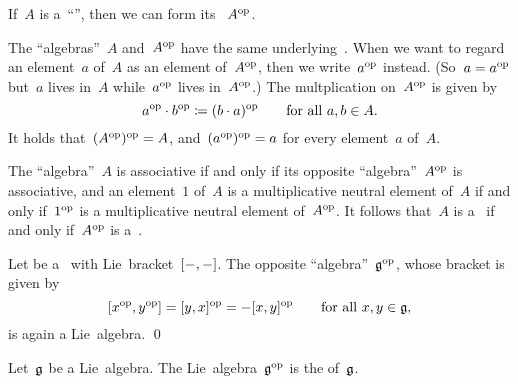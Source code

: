 \begin{recall}
	If~$A$ is a~\enquote{\algebra{$\kf$}}, then we can form its ~$A^{\mathrm{op}}$.

	The \enquote{algebras}~$A$ and~$A^{\mathrm{op}}$ have the same underlying~\vectorspace{$\kf$}.
	When we want to regard an element~$a$ of~$A$ as an element of~$A^{\mathrm{op}}$, then we write~$a^{\mathrm{op}}$ instead.
	(So~$a = a^{\mathrm{op}}$ but~$a$ lives in~$A$ while~$a^{\mathrm{op}}$ lives in~$A^{\mathrm{op}}$.)
	The multplication on~$A^{\mathrm{op}}$ is given by
	\[
		a^{\mathrm{op}} \cdot b^{\mathrm{op}}
		\coloneqq
		(b \cdot a)^{\mathrm{op}}
		\qquad
		\text{for all~$a, b \in A$.}
	\]
	It holds that~$(A^{\mathrm{op}})^{\mathrm{op}} = A$, and~$(a^{\mathrm{op}})^{\mathrm{op}} = a$ for every element~$a$ of~$A$.

	The \enquote{algebra}~$A$ is associative if and only if its opposite \enquote{algebra}~$A^{\mathrm{op}}$ is associative, and an element~$1$ of~$A$ is a multiplicative neutral element of~$A$ if and only if~$1^{\mathrm{op}}$ is a multiplicative neutral element of~$A^{\mathrm{op}}$.
	It follows that~$A$ is a~{\algebra{$\kf$}} if and only if~$A^{\mathrm{op}}$ is a~\algebra{$\kf$}.
\end{recall}


\begin{proposition}
	Let be a~\liealgebra{$\kf$} with Lie~bracket~$[-, -]$.
	The opposite \enquote{algebra}~$\mathfrak{g}^{\mathrm{op}}$, whose bracket is given by
	\[
		[x^{\mathrm{op}}, y^{\mathrm{op}}]
		=
		[y,x]^{\mathrm{op}}
		=
		-[x,y]^{\mathrm{op}}
		\qquad
		\text{for all~$x, y \in \mathfrak{g}$,}
	\]
	is again a Lie~algebra.
	\qed
\end{proposition}


\begin{definition}
	Let~$\mathfrak{g}$ be a Lie~algebra.
	The Lie~algebra~$\mathfrak{g}^{\mathrm{op}}$ is the  of~$\mathfrak{g}$.
\end{definition}





